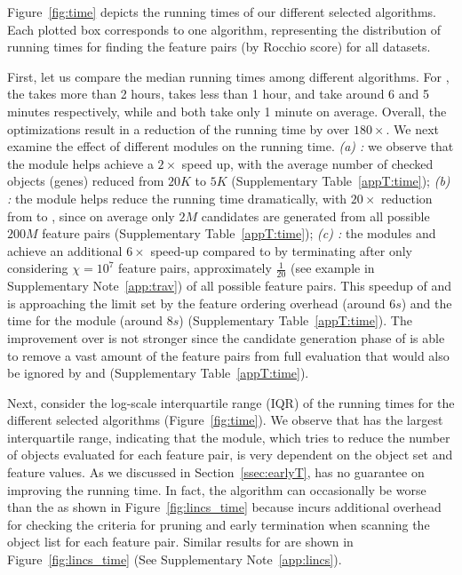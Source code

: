  Figure~\ref{fig:time} depicts the running times of our different selected algorithms. Each plotted box corresponds to one algorithm, representing the distribution of running times for finding the \topk feature pairs (by Rocchio score) for all datasets.

First, let us compare the median running times among different algorithms. For \msig, the \baseline takes more than 2 hours, \earlyOrder takes less than 1 hour, \samp and \sampOpt take around 6 and 5 minutes respectively, while \horiz and \vertic both take only 1 minute on average. Overall, the optimizations result in a reduction of the running time by over {\bf $180\times$}. We next examine the effect of different modules on the running time. {\em (a) \earlyT:} we observe that the \earlyT module helps achieve a $2\times$ speed up, with the average number of checked objects (genes) reduced from $20K$ to $5K$ (Supplementary Table~\ref{appT:time}); {\em (b) \sampling:} the \sampling module helps reduce the running time dramatically, with $20\times$ reduction from \baseline to \sampOpt, since on average only $2M$ candidates are generated from all possible $200M$ feature pairs (Supplementary Table~\ref{appT:time});
{\em (c) \traversal:} the modules \horiz and \vertic achieve an additional $6\times$ speed-up compared to \sampOpt by terminating after only considering $\chi=10^7$ feature pairs, approximately $\frac{1}{20}$ (see example in Supplementary Note~\ref{app:trav}) of all possible feature pairs. This speedup of \horiz and \vertic is approaching the limit set by the feature ordering overhead (around $6s$) and the time for the \trans module (around $8s$) (Supplementary Table~\ref{appT:time}). The improvement over \sampOpt is not stronger since the candidate generation phase of \sampOpt is able to remove a vast amount of the feature pairs from full evaluation that would also be ignored by \horiz and \vertic (Supplementary Table~\ref{appT:time}).

Next, consider the log-scale interquartile range (IQR) of the running times for the different selected algorithms (Figure~\ref{fig:time}). We observe that \earlyOrder has the largest interquartile range, indicating that the \earlyT module, which tries to reduce the number of objects evaluated for each feature pair, is very dependent on the object set and feature values. As we discussed in Section~\ref{ssec:earlyT}, \earlyT has no guarantee on improving the running time. In fact, the algorithm can occasionally be worse than the \baseline as shown in Figure~\ref{fig:lincs_time} because \earlyT incurs additional overhead for checking the criteria for pruning and early termination when scanning the object list for each feature pair.
Similar results for \lincs are shown in Figure~\ref{fig:lincs_time} (See Supplementary Note~\ref{app:lincs}).

